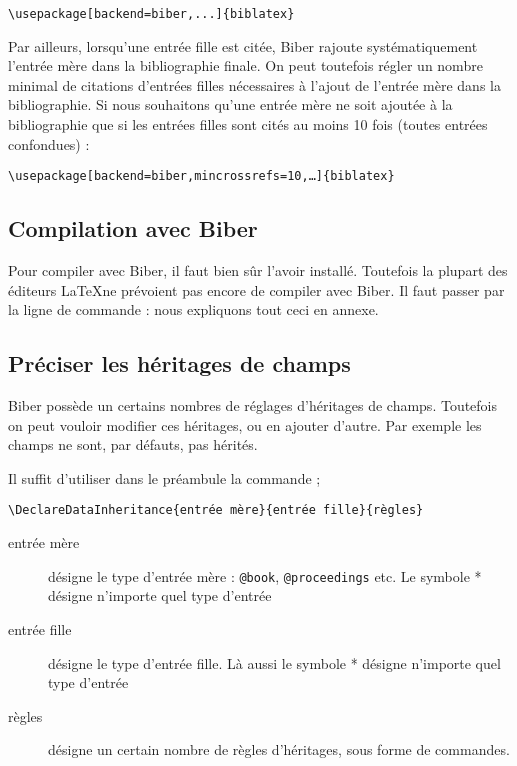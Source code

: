 \begin{verbatim}
\usepackage[backend=biber,...]{biblatex}
\end{verbatim}

Par ailleurs, lorsqu'une entrée fille est citée, Biber rajoute systématiquement l'entrée mère dans la bibliographie finale. On peut toutefois régler un nombre minimal de citations d'entrées filles nécessaires à l'ajout de l'entrée mère dans la bibliographie. Si nous souhaitons qu'une entrée mère ne soit ajoutée à la bibliographie que si les entrées filles sont cités au moins 10 fois (toutes entrées confondues) :


\begin{verbatim}
\usepackage[backend=biber,mincrossrefs=10,…]{biblatex}
\end{verbatim}

\subsection{Compilation avec Biber}

Pour compiler avec Biber, il faut bien sûr l'avoir installé. Toutefois la plupart des éditeurs \LaTeX ne prévoient pas encore de compiler avec Biber. Il faut passer par la ligne de commande : nous expliquons tout ceci en annexe.

\subsection{Préciser les héritages de champs}

Biber possède un certains nombres de réglages d'héritages de champs. Toutefois on peut vouloir modifier ces héritages, ou en ajouter d'autre. Par exemple les champs  ne sont, par défauts, pas hérités. 

Il suffit d'utiliser dans le préambule la commande ;

\begin{verbatim}
\DeclareDataInheritance{entrée mère}{entrée fille}{règles}
\end{verbatim}

\begin{description}
	\item[entrée mère]désigne le type d'entrée mère : \verb|@book|, \verb|@proceedings| etc. Le symbole * désigne n'importe quel type d'entrée
	\item[entrée fille]désigne le type d'entrée fille. Là aussi le symbole * désigne n'importe quel type d'entrée
	\item[règles] désigne un certain nombre de règles d'héritages, sous forme de commandes.
\end{description}

